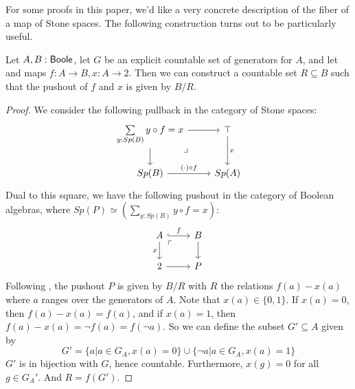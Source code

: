 For some proofs in this paper, 
we'd like a very concrete description of the fiber of a map of Stone spaces. 
The following construction turns out to be particularly useful. 
\begin{lemma}\label{FiberConstruction}
  Let $A,B:\mathsf{Boole}$, let $G$ be an explicit countable set of generators for $A$, and let 
  and maps $f:A \to B, x:A\to 2$. 
  Then we can construct a countable set $R\subseteq B$ such that 
  the pushout of $f$ and $x$ is given by $B/R$. 
\end{lemma}  
\begin{proof}
We consider the following pullback in the category of Stone spaces:
  \begin{equation}\begin{tikzcd}
    \sum\limits_{y:Sp(B)} y\circ f = x \arrow[d] \arrow[r] \arrow["\lrcorner"{pos=0.125}, phantom, dr] 
    & \top \arrow[d,"x"]\\
    Sp(B) \arrow[r,"(\cdot) \circ f"] & Sp(A)
  \end{tikzcd}  \end{equation}
Dual to this square, we have the following pushout in the category of Boolean algebras,
where $Sp(P) \simeq  (\sum\limits_{y:Sp(B)} y \circ f = x)$:
  \begin{equation}\begin{tikzcd}
    A \arrow[d,"x"'] \arrow[r,hook,"f"] \arrow[rd,phantom,"\ulcorner"{pos=0.125}] & B\arrow[d]\\
    2 \arrow[r] & P
  \end{tikzcd}\end{equation} 
  Following , 
  the pushout $P$ is given by $B/R$ with $R$ the relations $f(a) -x(a)$ 
  where $a$ ranges over the generators of $A$.
  Note that $x(a) \in \{0,1\}$. 
  If $x(a)=0$, then $f(a)-x(a) = f(a)$, 
  and if $x(a) = 1$, then $f(a) -x(a) = \neg f(a) = f(\neg a)$. 
  So we can define the subset $G'\subseteq A$ given by 
  \begin{equation}
    G' = \{a | a\in G_A, x(a) = 0\} \cup \{\neg a | a \in G_A, x(a) = 1\}
  \end{equation} 
  $G'$ is in bijection with $G$, hence countable. 
  Furthermore, $x(g) = 0$ for all $g\in G_A'$. 
  And $R = f(G')$.
\end{proof}








